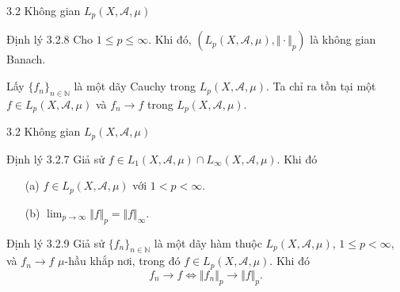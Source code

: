 \documentclass[notheorems,envcountsect,hyperref=unicode]{beamer}
\newcommand{\R}{\mathbb R}
\newcommand{\N}{\mathbb N}
\def\A{\mathcal{A}}
\def\R{\mathbb{R}}
\def\N{\mathbb{N}}
\def\Lpp{\mathit{L_p}}
\def\Loo{\mathit{L_{\infty}}}
\def\m{\mu}
\def\hkn{hầu khắp nơi}
\def\kgdd{(X,\A,\mu)}
\begin{document}
\begin{frame}{3.2 Không gian $\Lpp\kgdd$}
\begin{block}{\textnormal{Định lý 3.2.8}}
Cho $1\leq p\leq \infty$. Khi đó, $(\Lpp\kgdd,\Vert \cdot\Vert_p)$ là không gian Banach.
\end{block}
Lấy $\lbrace f_n\rbrace_{n\in\N}$ là một dãy Cauchy trong $\Lpp\kgdd$. Ta chỉ ra tồn tại một $f\in\Lpp\kgdd$ và $f_n\rightarrow f$ trong $\Lpp\kgdd$.
\end{frame}

%
\begin{frame}{3.2 Không gian $\Lpp\kgdd$ }
\begin{block}{\textnormal{Định lý 3.2.7}}
Giả sử $f\in\mathit{L}_1\kgdd \cap \mathit{L}_{\infty}\kgdd$. Khi đó
\begin{itemize}
\item[(a)] $f\in\Lpp\kgdd$ với $1<p<\infty$.
\item[(b)] $\lim_{p\rightarrow\infty}\Vert f\Vert_p=\Vert f\Vert_{\infty}.$
\end{itemize}
\end{block}

\begin{block}{\textnormal{Định lý 3.2.9}}
Giả sử $\lbrace f_n\rbrace_{n\in\N}$ là một dãy hàm thuộc $\Lpp\kgdd$, $1\leq p<\infty$, và $f_n\rightarrow f$ $\m$-\hkn, trong đó $f\in\Lpp\kgdd$. Khi đó
$$f_n\rightarrow f \iff \Vert f_n\Vert_p\rightarrow\Vert f\Vert_p.$$
\end{block}
\end{frame}
\end{document}
